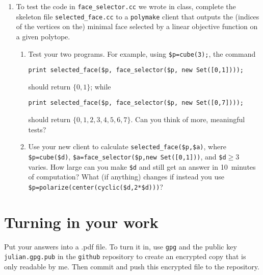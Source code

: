 \documentclass[11pt]{amsart}
\begin{document}
 \begin{enumerate}
   \setlength{\itemsep}{2ex}
 \item To test the code in \texttt{face\_selector.cc} we wrote in class, complete the skeleton file \texttt{selected\_face.cc} to a \texttt{polymake} client that outputs the (indices of the vertices on the) minimal face selected by a linear objective function on a given polytope. 
\begin{enumerate}
\item Test your two programs. For example, using \verb|$p=cube(3);|,
  the command 
\begin{verbatim}
print selected_face($p, face_selector($p, new Set([0,1])));
\end{verbatim}
should return $\{0,1\}$; while 
\begin{verbatim}
print selected_face($p, face_selector($p, new Set([0,7])));
\end{verbatim}
should return  $\{0,1,2,3,4,5,6,7\}$. Can you think of more, meaningful tests?

\item Use your new client to calculate \verb|selected_face($p,$a)|, where \verb|$p=cube($d)|, \verb|$a=face_selector($p,new Set([0,1]))|, and \verb|$d|${}\ge3$ varies. How large can you make \verb|$d| and still get an answer in 10~minutes of computation? What (if anything) changes if instead you use \verb|$p=polarize(center(cyclic($d,2*$d)))|? 
\end{enumerate}
 \end{enumerate}


\bigskip
\section*{Turning in your work}

Put your answers into a .pdf file. To turn it in, use \texttt{gpg} and the public key \texttt{julian.gpg.pub} in the \texttt{github} repository to create an encrypted copy that is only readable by me. Then commit and push this encrypted file to the repository.
\end{document}
